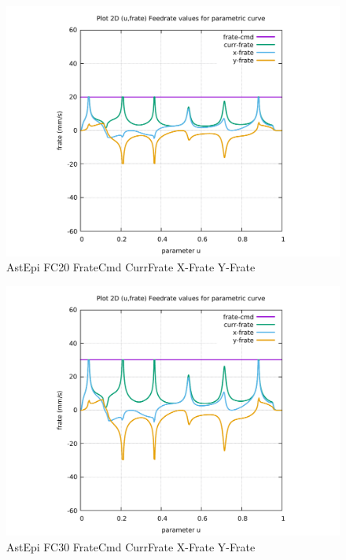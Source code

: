 \begin{figure}
	\caption     {AstEpi FC20 FrateCmd CurrFrate X-Frate Y-Frate}
	\label{28-img-AstEpi-FC20-FrateCmd-CurrFrate-X-Frate-Y-Frate.pdf}
\includegraphics[width=1.00\textwidth]{Chap4/appendix/app-AstEpi/plots/28-img-AstEpi-FC20-FrateCmd-CurrFrate-X-Frate-Y-Frate.pdf}
\end{figure}


\clearpage
\pagebreak

\begin{figure}
	\caption     {AstEpi FC30 FrateCmd CurrFrate X-Frate Y-Frate}
	\label{29-img-AstEpi-FC30-FrateCmd-CurrFrate-X-Frate-Y-Frate.pdf}
\includegraphics[width=1.00\textwidth]{Chap4/appendix/app-AstEpi/plots/29-img-AstEpi-FC30-FrateCmd-CurrFrate-X-Frate-Y-Frate.pdf}
\end{figure}


